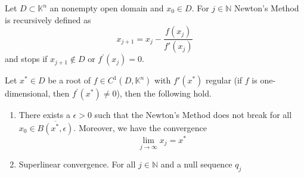 \begin{definition}
    Let \(D \subset \mathbb{K}^n\) an nonempty open domain and \(x_0 \in D\). For \(j \in \mathbb{N}\) Newton's Method is recursively defined as
    \begin{equation}
        x_{j+1} = x_j - \frac{f(x_j)}{f'(x_j)}
    \end{equation}
    and stops if \(x_{j+1} \not\in D\) or \(f^\prime (x_j) = 0\).
\end{definition}

\begin{theorem}
    Let \(x^* \in D\) be a root of \(f \in C^1 \left(D, \mathbb{K}^n\right)\) with \(f'(x^*)\) regular (if \(f\) is one-dimensional, then \(f^\prime (x^*) \neq 0\)), then the following hold.
    \begin{enumerate}
        \item There exists a \(\epsilon > 0\) such that the Newton's Method does not break for all \(x_0 \in \overline{B(x^*, \epsilon)}\). Moreover, we have the convergence
        \begin{equation}
            \lim_{j \rightarrow \infty} x_j = x^*
        \end{equation}
        \item Superlinear convergence. For all \(j \in \mathbb{N}\) and a null sequence \(q_j\)
    \end{enumerate}
\end{theorem}